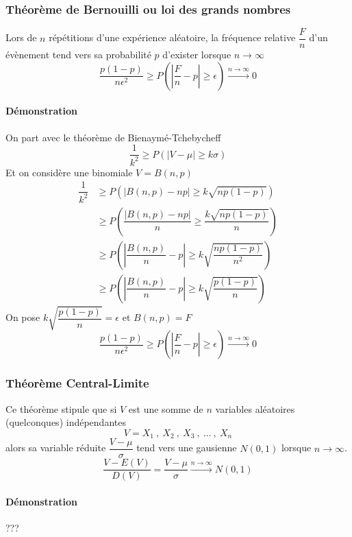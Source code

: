 \subsubsection{Théorème de Bernouilli ou loi des grands nombres}
Lors de $n$ répétitions d'une expérience aléatoire, la fréquence relative $\dfrac{F}{n}$ d'un évènement tend vers sa probabilité $p$ d'exister lorsque $n\rightarrow\infty$
$$\boxed{\dfrac{p(1-p)}{n\epsilon^2} \geq P\left(\left|\dfrac{F}{n}-p\right|\geq\epsilon\right) \stackrel{n\rightarrow\infty}{\rightarrow} 0}$$
\paragraph{Démonstration}
On part avec le théorème de Bienaymé-Tchebycheff
$$\dfrac{1}{k^2} \geq P(|V-\mu|\geq k\sigma)$$
Et on considère une binomiale $V = B(n,p)$
\begin{align*}
	\dfrac{1}{k^2} &\geq P\left(\left|B(n,p)-np\right|\geq k\sqrt{np(1-p)}\right)\\
                   &\geq P\left(\dfrac{\left|B(n,p)-np\right|}{n}\geq \dfrac{k\sqrt{np(1-p)}}{n}\right)\\
                   &\geq P\left(\left|\dfrac{B(n,p)}{n}-p\right|\geq k\sqrt{\dfrac{np(1-p)}{n^2}}\right)\\
                   &\geq P\left(\left|\dfrac{B(n,p)}{n}-p\right|\geq k\sqrt{\dfrac{p(1-p)}{n}}\right)
\end{align*}
On pose $k\sqrt{\dfrac{p(1-p)}{n}} = \epsilon$ et $B(n,p) = F$
$$\boxed{\dfrac{p(1-p)}{n\epsilon^2} \geq P\left(\left|\dfrac{F}{n}-p\right|\geq\epsilon\right) \stackrel{n\rightarrow\infty}{\rightarrow} 0}$$




\subsubsection{Théorème Central-Limite}
Ce théorème stipule que si $V$ est une somme de $n$ variables aléatoires (quelconques) indépendantes
$$V = X_1\ ,\ X_2\ ,\ X_3\ ,\ \dots\ ,\ X_n$$
alors sa variable réduite $\dfrac{V-\mu}{\sigma}$ tend vers une gausienne $N(0,1)$ lorsque $n\rightarrow\infty$.
$$\boxed{\dfrac{V-E(V)}{D(V)} = \dfrac{V-\mu}{\sigma} \stackrel{n\rightarrow\infty}{\rightarrow} N(0,1)}$$
\paragraph{Démonstration}
???




